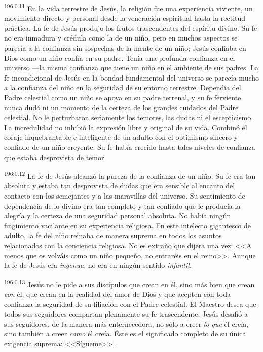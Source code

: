 \par 
\textsuperscript{196:0.11} En la vida terrestre de Jesús, la religión fue una experiencia viviente, un movimiento directo y personal desde la veneración espiritual hasta la rectitud práctica. La fe de Jesús produjo los frutos trascendentes del espíritu divino. Su fe no era inmadura y crédula como la de un niño, pero en muchos aspectos se parecía a la confianza sin sospechas de la mente de un niño; Jesús confiaba en Dios como un niño confía en su padre. Tenía una profunda confianza en el universo ---la misma confianza que tiene un niño en el ambiente de sus padres. La fe incondicional de Jesús en la bondad fundamental del universo se parecía mucho a la confianza del niño en la seguridad de su entorno terrestre. Dependía del Padre celestial como un niño se apoya en su padre terrenal, y su fe ferviente nunca dudó ni un momento de la certeza de los grandes cuidados del Padre celestial. No le perturbaron seriamente los temores, las dudas ni el escepticismo. La incredulidad no inhibió la expresión libre y original de su vida. Combinó el coraje inquebrantable e inteligente de un adulto con el optimismo sincero y confiado de un niño creyente. Su fe había crecido hasta tales niveles de confianza que estaba desprovista de temor.

\par 
\textsuperscript{196:0.12} La fe de Jesús alcanzó la pureza de la confianza de un niño. Su fe era tan absoluta y estaba tan desprovista de dudas que era sensible al encanto del contacto con los semejantes y a las maravillas del universo. Su sentimiento de dependencia de lo divino era tan completo y tan confiado que le producía la alegría y la certeza de una seguridad personal absoluta. No había ningún fingimiento vacilante en su experiencia religiosa. En este intelecto gigantesco de adulto, la fe del niño reinaba de manera suprema en todos los asuntos relacionados con la conciencia religiosa. No es extraño que dijera una vez: <<A menos que os volváis como un niño pequeño, no entraréis en el reino>>. Aunque la fe de Jesús era \textit{ingenua}, no era en ningún sentido \textit{infantil}.

\par 
\textsuperscript{196:0.13} Jesús no le pide a sus discípulos que crean en él, sino más bien que crean \textit{con} él, que crean en la realidad del amor de Dios y que acepten con toda confianza la seguridad de su filiación con el Padre celestial. El Maestro desea que todos sus seguidores compartan plenamente su fe trascendente. Jesús desafió a sus seguidores, de la manera más enternecedora, no sólo a creer \textit{lo que} él creía, sino también a creer \textit{como} él creía. Éste es el significado completo de su única exigencia suprema: <<Sígueme>>.

